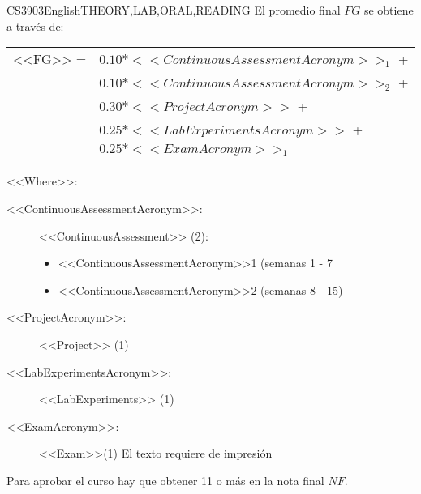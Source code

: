     \begin{evaluation}{CS3903}{English}{THEORY,LAB,ORAL,READING}
    El promedio final $FG$ se obtiene a través de:
   
    \begin{tabular}{cl}
        <<FG>> = & $0.10*<<ContinuousAssessmentAcronym>>_{1}$ +\\
                 & $0.10*<<ContinuousAssessmentAcronym>>_{2}$ +\\
                 & $0.30*<<ProjectAcronym>>$ + \\
                 & $0.25*<<LabExperimentsAcronym>>$ + \\
                 & $0.25*<<ExamAcronym>>_{1}$
    \end{tabular}
   
    \noindent <<Where>>:
    \begin{description}
    \item[<<ContinuousAssessmentAcronym>>:] <<ContinuousAssessment>> (2):
         \begin{itemize}
               \item  <<ContinuousAssessmentAcronym>>1 (semanas 1 - 7
                \item <<ContinuousAssessmentAcronym>>2 (semanas 8 - 15) 
         \end{itemize}
     \item[<<ProjectAcronym>>:]  <<Project>> (1)
     \item[<<LabExperimentsAcronym>>:] <<LabExperiments>> (1)
     \item[<<ExamAcronym>>:] <<Exam>>(1) El texto requiere de impresión
    \end{description}
  \noindent Para aprobar el curso hay que obtener 11 o más en la nota final $NF$.
    \end{evaluation}
   
 
 
 